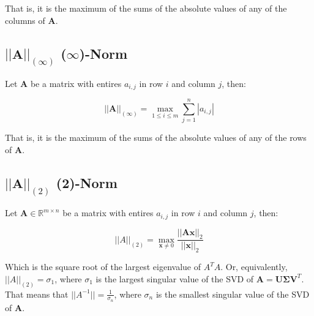 That is, it is the maximum of the sums of the absolute values of any of the columns of $\mathbf{A}$.

\subsection{$||\mathbf{A}||_{(\infty)}$ ($\infty$)-Norm}

Let $\mathbf{A}$ be a matrix with entires $a_{i,j}$ in row $i$ and column $j$, then:

\begin{equation}
||\mathbf{A}||_{(\infty)} = \max_{1\leq i \leq m} \sum^n_{j=1} |a_{i,j} |
\end{equation}

That is, it is the maximum of the sums of the absolute values of any of the rows of $\mathbf{A}$.

\subsection{$||\mathbf{A}||_{(2)}$ (2)-Norm}
\label{2norm}

Let $\mathbf{A} \in \mathbb{R}^{m\times n}$ be a matrix with entires $a_{i,j}$ in row $i$ and column $j$, then:

\begin{equation}
||A||_{(2)} = \max_{\mathbf{x}\neq 0} \frac{||\mathbf{Ax}||_2}{||\mathbf{x}||_2}
\end{equation}

Which is the square root of the largest eigenvalue of $A^T A$. Or, equivalently, $||A||_{(2)} = \sigma_1$, where $\sigma_1$ is the largest singular value of the SVD of $\mathbf{A} = \mathbf{U\Sigma V}^T$. That means that $||A^{-1}|| = \frac{1}{\sigma_n}$, where $\sigma_n$ is the smallest singular value of the SVD of $\mathbf{A}$.




